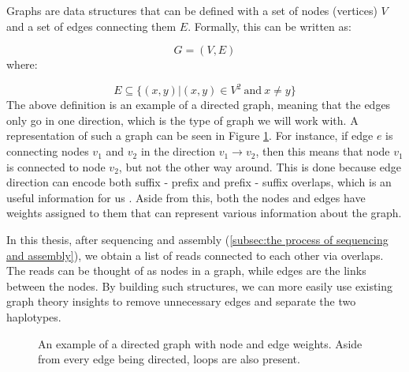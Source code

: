 \documentclass[times, utf8, diplomski, english]{fer_eng}
\begin{document}
Graphs are data structures that can be defined with a set of nodes (vertices) $V$ and a set of edges connecting them $E$. Formally, this can be written as:

\[ G = (V, E) \]
where:

\[ E \subseteq 	\{ (x, y)|(x, y) \in V^2 \mathrm{\ and\ } x \neq y \} \]
The above definition is an example of a directed graph, meaning that the edges only go in one direction, which is the type of graph we will work with. A representation of such a graph can be seen in Figure \ref{fig:example_graph}. For instance, if edge $e$ is connecting nodes $v_1$ and $v_2$ in the direction $v_1 \rightarrow v_2$, then this means that node $v_1$ is connected to node $v_2$, but not the other way around. This is done because edge direction can encode both suffix - prefix and prefix - suffix overlaps, which is an useful information for us \cite{trudeau_2017}. Aside from this, both the nodes and edges have weights assigned to them that can represent various information about the graph.

In this thesis, after sequencing and assembly (\ref{subsec:the process of sequencing and assembly}), we obtain a list of reads connected to each other via overlaps. The reads can be thought of as nodes in a graph, while edges are the links between the nodes. By building such structures, we can more easily use existing graph theory insights to remove unnecessary edges and separate the two haplotypes.

\begin{figure}
\centering
{}
\caption[Example graph]{An example of a directed graph with node and edge weights. Aside from every edge being directed, loops are also present.}
\label{fig:example_graph}
\end{figure}
\end{document}
